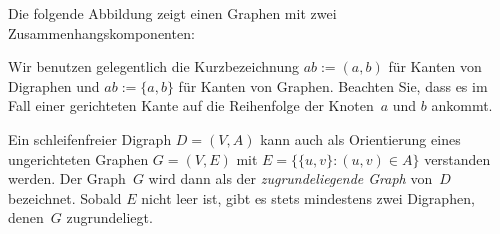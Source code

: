 \begin{bsp}
Die folgende Abbildung zeigt einen Graphen mit zwei Zusammenhangskomponenten:

\begin{center}
\end{center}
\end{bsp} 

\begin{bem}
Wir benutzen gelegentlich die Kurzbezeichnung $ab:=(a,b)$ für Kanten von Digraphen und $ab:=\{a,b\}$ für Kanten von Graphen.
Beachten Sie, dass es im Fall einer gerichteten Kante auf die Reihenfolge der Knoten~$a$ und $b$ ankommt.
\end{bem}

\begin{defn}
Ein schleifenfreier Digraph $D = (V,A)$ kann auch als Orientierung eines ungerichteten Graphen $G=(V,E)$ mit $E = \{\{u,v\} : (u,v) \in A\}$ verstanden werden.
Der Graph~$G$ wird dann als der \emph{zugrundeliegende Graph} von~$D$ bezeichnet.
Sobald $E$ nicht leer ist, gibt es stets mindestens zwei Digraphen, denen~$G$ zugrundeliegt.
\end{defn} 

